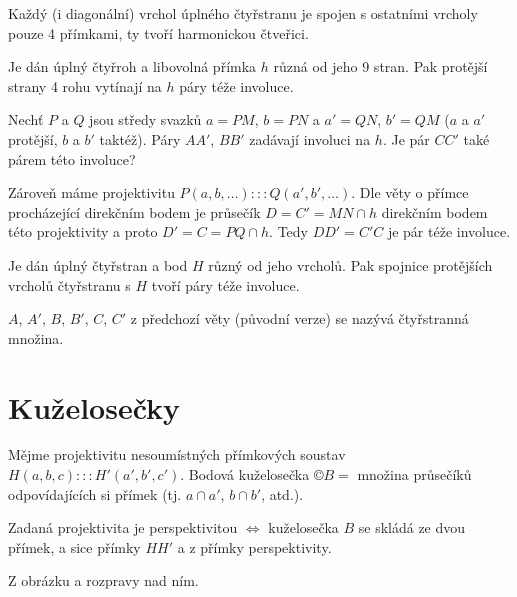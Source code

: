 \documentclass[12pt]{article}					%
\begin{document}
\begin{veta}
	Každý (i diagonální) vrchol úplného čtyřstranu je spojen s ostatními vrcholy pouze 4 přímkami, ty tvoří harmonickou čtveřici.
\end{veta}

\begin{veta}
	Je dán úplný čtyřroh a libovolná přímka $h$ různá od jeho 9 stran. Pak protější strany 4 rohu vytínají na $h$ páry téže involuce.

	\begin{dukazin}
		Nechť $P$ a $Q$ jsou středy svazků $a = PM$, $b = PN$ a $a' = QN$, $b' = QM$ ($a$ a $a'$ protější, $b$ a $b'$ taktéž). Páry $AA'$, $BB'$ zadávají involuci na $h$. Je pár $CC'$ také párem této involuce?

		Zároveň máme projektivitu $P(a, b, …) ::: Q(a', b', …)$. Dle věty o přímce procházející direkčním bodem je průsečík $D = C' = MN \cap h$ direkčním bodem této projektivity a proto $D' = C = PQ \cap h$. Tedy $DD' = C'C$ je pár téže involuce.
	\end{dukazin}
\end{veta}

\begin{veta}
	Je dán úplný čtyřstran a bod $H$ různý od jeho vrcholů. Pak spojnice protějších vrcholů čtyřstranu s $H$ tvoří páry téže involuce.
\end{veta}

\begin{poznamka}
	$A$, $A'$, $B$, $B'$, $C$, $C'$ z předchozí věty (původní verze) se nazývá čtyřstranná množina.
\end{poznamka}

\section{Kuželosečky}
\begin{definice}
	Mějme projektivitu nesoumístných přímkových soustav $H(a, b, c) ::: H'(a', b', c')$. Bodová kuželosečka $©B = $ množina průsečíků odpovídajících si přímek (tj. $a \cap a'$, $b \cap b'$, atd.).
\end{definice}

\begin{veta}
	Zadaná projektivita je perspektivitou $\Leftrightarrow$ kuželosečka $B$ se skládá ze dvou přímek, a sice přímky $HH'$ a z přímky perspektivity.

	\begin{dukazin}
		Z obrázku a rozpravy nad ním.
	\end{dukazin}
\end{veta}
\end{document}
